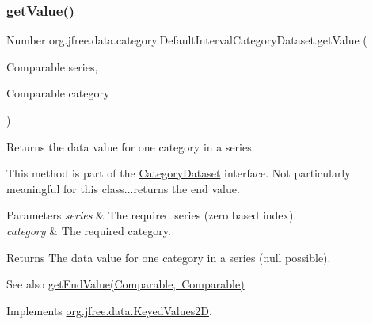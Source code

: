 \subsubsection{\texorpdfstring{get\+Value()}{getValue()}\hspace{0.1cm}{\footnotesize\ttfamily [1/2]}}
{\footnotesize\ttfamily Number org.\+jfree.\+data.\+category.\+Default\+Interval\+Category\+Dataset.\+get\+Value (\begin{DoxyParamCaption}\item[{Comparable}]{series,  }\item[{Comparable}]{category }\end{DoxyParamCaption})}

Returns the data value for one category in a series. 

This method is part of the \mbox{\hyperlink{interfaceorg_1_1jfree_1_1data_1_1category_1_1_category_dataset}{Category\+Dataset}} interface. Not particularly meaningful for this class...returns the end value.


\begin{DoxyParams}{Parameters}
{\em series} & The required series (zero based index). \\
\hline
{\em category} & The required category.\\
\hline
\end{DoxyParams}
\begin{DoxyReturn}{Returns}
The data value for one category in a series (null possible).
\end{DoxyReturn}
\begin{DoxySeeAlso}{See also}
\mbox{\hyperlink{classorg_1_1jfree_1_1data_1_1category_1_1_default_interval_category_dataset_a6b536be218d6a7cafe97ef2d26c85c38}{get\+End\+Value(\+Comparable, Comparable)}} 
\end{DoxySeeAlso}


Implements \mbox{\hyperlink{interfaceorg_1_1jfree_1_1data_1_1_keyed_values2_d_a61c450ca108cd99e53174fc91393a99a}{org.\+jfree.\+data.\+Keyed\+Values2D}}.

\mbox{\label{classorg_1_1jfree_1_1data_1_1category_1_1_default_interval_category_dataset_a675e42c05d2be1193e867907ad490995}} 
